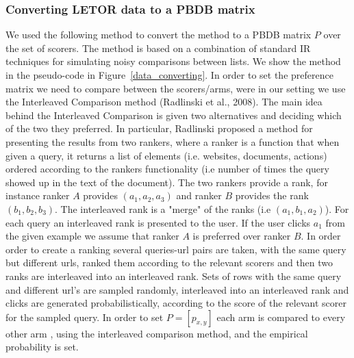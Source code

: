 \documentclass{llncs}
\begin{document}
\subsubsection{Converting LETOR data to a PBDB matrix}
We used the following method to convert the method to a PBDB matrix $P$ over the set of scorers.  
The method is based on a combination of standard IR techniques for simulating noisy comparisons between lists.  We show the method in the pseudo-code in Figure~\ref{data_converting}.
In order to set the preference matrix we need to compare between the scorers/arms, were in our setting we use the Interleaved Comparison method (Radlinski et al., 2008).
The main idea behind the Interleaved Comparison is given two alternatives and deciding which of the two they preferred. 
In particular, Radlinski proposed a method for presenting the results from two rankers, where a ranker is a function that when given a query, it returns a list of elements (i.e. websites, documents, actions) ordered according to the rankers functionality (i.e number of times the query showed up in the text of the document).
The two rankers provide a rank, for instance ranker $A$ provides $(a_1,a_2,a_3)$ and ranker $B$ provides the rank $(b_1,b_2,b_3)$.
The interleaved rank is a "merge" of the ranks (i.e $(a_1,b_1,a_2)$). 
For each query an interleaved rank is presented to the user. If the user clicks $a_1$ from the given example we assume that ranker $A$ is preferred over ranker $B$.
In order order to create a ranking several queries-url pairs are taken, with the same query but different urls, ranked them according to the relevant scorers and then two ranks are interleaved into an interleaved rank.
Sets of rows with the same query and different url's are sampled randomly, interleaved into an interleaved rank and clicks are generated probabilistically, according to the score of the relevant scorer for the sampled query. 
In order to set  $P = [p_{x,y}]$ each arm is compared to every other arm , using the interleaved comparison method, and the empirical probability is set.
\end{document}
